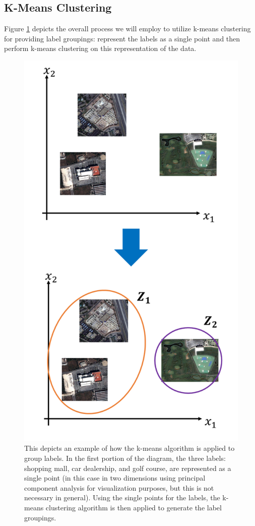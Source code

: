 \documentclass[../thesis.tex]{subfiles}
\begin{document}
\subsection{K-Means Clustering}
Figure \ref{fig:ex-kmeans} depicts the overall process we will employ to utilize
k-means clustering for providing label groupings: represent the labels as a
single point and then perform k-means clustering on this representation of the
data.
\begin{figure}
    \centering
    \includegraphics[width=.8\linewidth]{images/ex-kmeans.pdf}
    \caption[K-means Based Label Grouping]{This depicts an example of how the
    k-means algorithm is applied to group labels. In the first portion of the
    diagram, the three labels: shopping mall, car dealership, and golf course,
    are represented as a single point (in this case in two dimensions using
    principal component analysis for visualization purposes, but this is not
    necessary in general). Using the single points for the labels, the k-means
    clustering algorithm is then applied to generate the label groupings.}
    \label{fig:ex-kmeans}
\end{figure}
\end{document}
